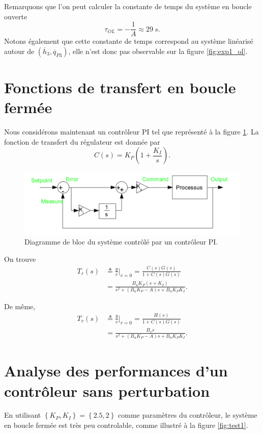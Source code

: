 \documentclass[frenchb, paper=a4, fontsize=11pt]{scrartcl}
\newcommand*\eq[1]{\overline{#1}} 				%
\numberwithin{equation}{section}					%
\numberwithin{figure}{section}					%
\numberwithin{table}{section}						%
\begin{document}
Remarquons que l'on peut calculer la constante de temps du système en boucle
ouverte
\begin{equation}
	\tau_{OL} = -\frac{1}{A} \approx \SI{29}{s}.
\end{equation}
Notons également que cette constante de temps correspond au système linéarisé
autour de $(\eq{h}_3, \eq{q}_{P3})$, elle n'est donc pas observable sur
la figure \ref{fig:exp1_ol}.

\section{Fonctions de transfert en boucle fermée}
Nous considérons maintenant un contrôleur PI tel que représenté
à la figure \ref{fig:closed_loop}. La fonction de transfert du
régulateur est donnée par
\begin{equation}
	C(s) = K_P\left(1+\frac{K_I}{s}\right).
\end{equation}

\begin{figure}[!ht]
	\centering
	\includegraphics[width=\linewidth]{img/closed_loop.png}
	\caption{Diagramme de bloc du système contrôlé par un contrôleur PI.}
	\label{fig:closed_loop}
\end{figure}

On trouve
\begin{align}
	T_r(s) 	& \triangleq \frac{y}{r}\Big|_{v=0} = \frac{C(s)G(s)}{1+C(s)G(s)} \\
			&= \frac{B_uK_P(s+K_I )}{s^2 +(B_uK_P-A)s + B_u K_P K_I}.
\end{align}

De même,
\begin{align}
	T_v(s)	& \triangleq \frac{y}{v}\Big|_{r=0} = \frac{H(s)}{1+C(s)G(s)}\\
			& = \frac{B_v s}{s^2 + (B_u K_P-A)s + B_u K_P K_I}.
\end{align}

\section{Analyse des performances d'un contrôleur sans perturbation}
En utilisant $\left\{K_P,K_I\right\}=\left\{2.5,2\right\}$ comme
paramètres du contrôleur, le système en boucle fermée est très peu
controlable, comme illustré à la figure \ref{fig:test1}.
\end{document}
